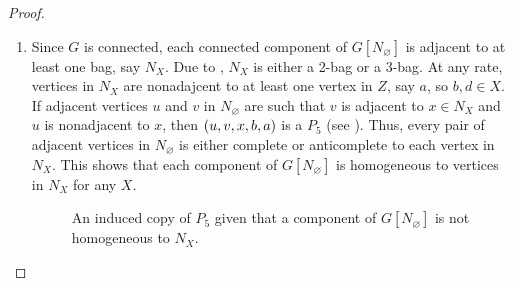 \begin{proof}
    \leavevmode \par
    \begin{enumerate}[label=(\roman*)]
        \item Since $G$ is connected, each connected component of
            $G[N_\varnothing]$ is adjacent to at least one bag, say $N_X$. Due
            to , $N_X$ is either a 2-bag
            or a 3-bag. At any rate, vertices in $N_X$ are nonadajcent to at
            least one vertex in $Z$, say $a$, so $b,d\in X$. If adjacent
            vertices $u$ and $v$ in $N_{\varnothing}$ are such that $v$ is
            adjacent to $x\in N_X$ and $u$ is nonadjacent to $x$, then
            $\left(u,v,x,b,a\right)$ is a $P_5$ (see ). Thus, every
            pair of adjacent vertices in $N_{\varnothing}$ is either complete or
            anticomplete to each vertex in $N_X$. This shows that each component
            of $G[N_{\varnothing}]$ is homogeneous to vertices in $N_X$ for any
            $X$.

            \begin{figure}[htb!]
                \centering
                \caption{An induced copy of $P_5$ given that a component of
                    $G[N_{\varnothing}]$ is not homogeneous to $N_X$.}
                \label{fig:type_8_1}
            \end{figure}


\end{enumerate}
\end{proof}
